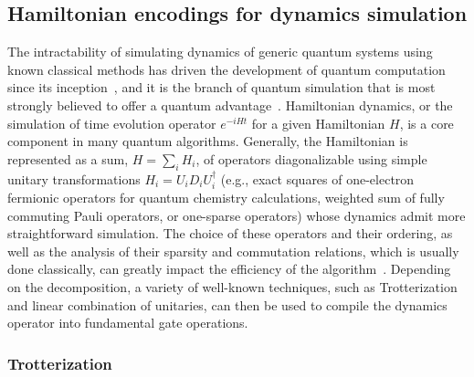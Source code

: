 \subsection{Hamiltonian encodings for dynamics simulation}

The intractability of simulating dynamics of generic quantum systems using known classical methods has driven the development of quantum computation since its inception~\cite{feynman2018simulating}, and it is the branch of quantum simulation that is most strongly believed to offer a quantum advantage~\cite{lloyd1996universal}.
Hamiltonian dynamics, or the simulation of time evolution operator $e^{-iHt}$ for a given Hamiltonian $H$, is a core component in many quantum algorithms. Generally, the Hamiltonian is represented as a sum, $H=\sum_i H_i$, of operators diagonalizable using simple unitary transformations $H_i = U_i D_i U_i^\dagger$ (e.g., exact squares of one-electron fermionic operators for quantum chemistry calculations, weighted sum of fully commuting Pauli operators, or one-sparse operators) whose dynamics admit more straightforward simulation.
The choice of these operators and their ordering, as well as the analysis of their sparsity and commutation relations, which is usually done classically, can greatly impact the efficiency of the algorithm~\cite{martinez2trotter}. Depending on the decomposition, a variety of well-known techniques, such as Trotterization and linear combination of unitaries, can then be used to compile the dynamics operator into fundamental gate operations.

\subsubsection{Trotterization}
\label{trotter_sec}

